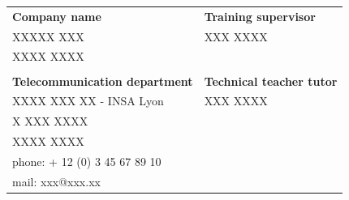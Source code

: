 \begin{titlepage}
\begin{center}
    \end{center}
	{\large
	\begin{tabular}{@{}p{}p{}@{}}
	
    \textbf{Company name} & \hfill \textbf{Training supervisor} \\
		XXXXX XXX & \hfill XXX XXXX \\
		XXXX XXXX & \\
		&  \\
		\textbf{Telecommunication department} & \hfill \textbf{Technical teacher tutor} \\
		XXXX XXX XX {-} INSA Lyon & \hfill XXX XXXX\\
		X XXX XXXX & \\
		XXXX XXXX & \\
		phone: + 12 (0) 3 45 67 89 10 & \\
		mail: xxx@xxx.xx & \\

	\end{tabular}}
	\vfill\begin{center} \thedate{}
	\end{center}

\end{titlepage}

\clearpage